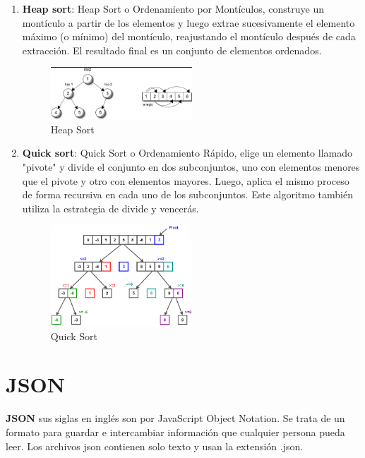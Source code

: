 \begin{enumerate}
    \item \textbf{Heap sort}:
    Heap Sort o Ordenamiento por Montículos, construye un montículo a partir de los elementos y luego extrae sucesivamente el elemento máximo (o mínimo) del montículo, 
    reajustando el montículo después de cada extracción. 
    El resultado final es un conjunto de elementos ordenados.
    \begin{figure}[H]
        \centering %
        \includegraphics[width=0.5\textwidth]{./src/images/HeapSort.png} %
        \caption{Heap Sort} %
        \label{fig:imagen 5} %
    \end{figure}
    \newpage

    \item \textbf{Quick sort}:
    Quick Sort o Ordenamiento Rápido, elige un elemento llamado "pivote" y divide el conjunto en dos subconjuntos, 
    uno con elementos menores que el pivote y otro con elementos mayores. 
    Luego, aplica el mismo proceso de forma recursiva en cada uno de los subconjuntos. Este algoritmo también utiliza la estrategia de divide y vencerás.
    \begin{figure}[H]
        \centering %
        \includegraphics[width=0.5\textwidth]{./src/images/QuickSort.png} %
        \caption{Quick Sort} %
        \label{fig:imagen 6} %
    \end{figure}
    \end{enumerate}
\section{JSON}
\textbf{JSON} sus siglas en inglés son por JavaScript Object Notation. 
Se trata de un formato para guardar e intercambiar información que cualquier persona pueda leer. 
Los archivos json contienen solo texto y usan la extensión .json.

